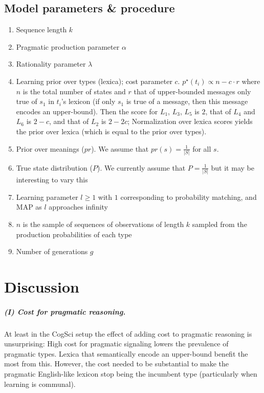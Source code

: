 \documentclass[a4paper]{article}
\begin{document}
\subsection{Model parameters \& procedure} 
\begin{enumerate}
  \item Sequence length $k$
  \item Pragmatic production parameter $\alpha$
  \item Rationality parameter $\lambda$
  \item Learning prior over types (lexica); cost parameter $c$. $p^\star(t_i) \propto n - c \cdot r$ where $n$ is the total number of states and $r$ that of upper-bounded messages only true of $s_1$ in $t_i$'s lexicon (if only $s_1$ is true of a message, then this message encodes an upper-bound). Then the score for $L_1$, $L_3$, $L_5$ is $2$, that of $L_4$ and $L_6$ is $2-c$, and that of $L_2$ is $2-2c$; Normalization over lexica scores yields the prior over lexica (which is equal to the prior over types).   
  \item Prior over meanings ($pr$). We assume that $pr(s) = \frac{1}{|S|}$ for all $s$.
  \item True state distribution ($P$). We currently assume that $P = \frac{1}{|S|}$ but it may be interesting to vary this
  \item Learning parameter $l \geq 1$ with $1$ corresponding to probability matching, and MAP as $l$ approaches infinity
  \item $n$ is the sample of sequences of observations of length $k$ sampled from the production probabilities of each type
  \item Number of generations $g$
\end{enumerate}





\section{Discussion}
\subparagraph{(I) Cost for pragmatic reasoning.} At least in the CogSci setup the effect of adding cost to pragmatic reasoning is unsurprising: High cost for pragmatic signaling lowers the prevalence of pragmatic types. Lexica that semantically encode an upper-bound benefit the most from this. However, the cost needed to be substantial to make the pragmatic English-like lexicon stop being the incumbent type (particularly when learning is communal). 
\end{document}
